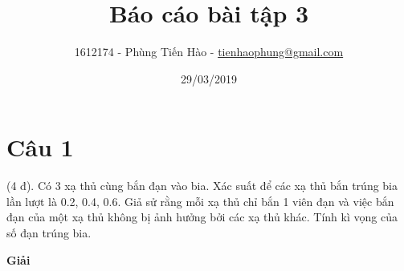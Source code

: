 \documentclass[a4paper,12pt]{article}
\title{Báo cáo bài tập 3}
\author{1612174 - Phùng Tiến Hào - \href{mailto:tienhaophung@gmail.com}{tienhaophung@gmail.com}}
\date{29/03/2019}
\begin{document}
	\maketitle
	\newpage
	
	\doublespacing
	\tableofcontents
	\singlespace
	
	\newpage
	
	\section{Câu 1}
	(4 đ). Có 3 xạ thủ cùng bắn đạn vào bia. Xác suất để các xạ thủ bắn trúng bia lần lượt là
	0.2, 0.4, 0.6. Giả sử rằng mỗi xạ thủ chỉ bắn 1 viên đạn và việc bắn đạn của một xạ thủ không bị
	ảnh hưởng bởi các xạ thủ khác. Tính kì vọng của số đạn trúng bia.\\
	
	\begin{center}
		\textbf{Giải}
	\end{center}
	
\end{document}
